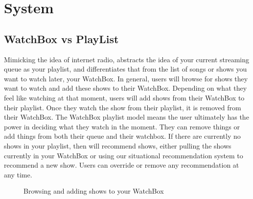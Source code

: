 \section{System}

\subsection{WatchBox vs PlayList}
Mimicking the idea of internet radio, {\sys} abstracts the idea of
your current streaming queue as your playlist, and differentiates that
from the list of songs or shows you want to watch later, your
WatchBox.  In general, users will browse for shows they want to watch
and add these shows to their WatchBox.  Depending on what they feel
like watching at that moment, users will add shows from their WatchBox
to their playlist.  Once they watch the show from their playlist, it
is removed from their WatchBox.  The WatchBox playlist model means the
user ultimately has the power in deciding what they watch in the
moment.  They can remove things or add things from both their queue
and their watchbox.  If there are currently no shows in your playlist,
then {\sys} will recommend shows, either pulling the shows currently
in your WatchBox or using our situational recommendation system to
recommend a new show.  Users can override or remove any recommendation
at any time.


\begin{figure}
\centering
{}

\caption{Browsing and adding shows to your WatchBox}
\label{fig:watchbox}
\end{figure}

